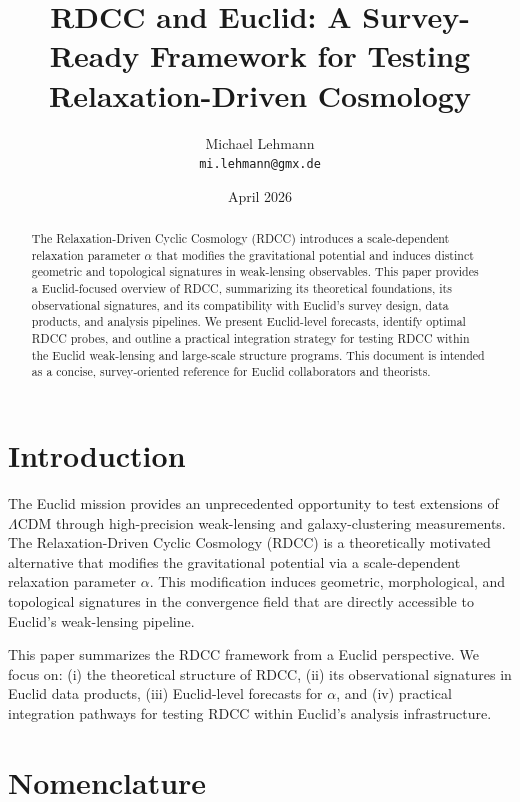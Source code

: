 \documentclass[11pt,a4paper]{article}
\title{\textbf{RDCC and Euclid: A Survey-Ready Framework for Testing Relaxation-Driven Cosmology}}
\author{Michael Lehmann \\ \texttt{mi.lehmann@gmx.de}}
\date{April 2026}
\begin{document}
\maketitle

\begin{abstract}
The Relaxation-Driven Cyclic Cosmology (RDCC) introduces a scale-dependent 
relaxation parameter $\alpha$ that modifies the gravitational potential and 
induces distinct geometric and topological signatures in weak-lensing 
observables. This paper provides a Euclid-focused overview of RDCC, summarizing 
its theoretical foundations, its observational signatures, and its compatibility 
with Euclid's survey design, data products, and analysis pipelines. We present 
Euclid-level forecasts, identify optimal RDCC probes, and outline a practical 
integration strategy for testing RDCC within the Euclid weak-lensing and 
large-scale structure programs. This document is intended as a concise, 
survey-oriented reference for Euclid collaborators and theorists.
\end{abstract}
\section{Introduction}

The Euclid mission provides an unprecedented opportunity to test extensions of 
$\Lambda$CDM through high-precision weak-lensing and galaxy-clustering 
measurements. The Relaxation-Driven Cyclic Cosmology (RDCC) is a theoretically 
motivated alternative that modifies the gravitational potential via a 
scale-dependent relaxation parameter $\alpha$. This modification induces 
geometric, morphological, and topological signatures in the convergence field 
that are directly accessible to Euclid's weak-lensing pipeline.

This paper summarizes the RDCC framework from a Euclid perspective. We focus on:
(i) the theoretical structure of RDCC, (ii) its observational signatures in 
Euclid data products, (iii) Euclid-level forecasts for $\alpha$, and 
(iv) practical integration pathways for testing RDCC within Euclid's analysis 
infrastructure.

\section*{Nomenclature}
\end{document}
